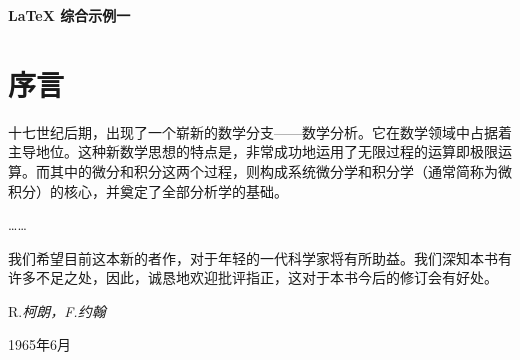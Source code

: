 \documentclass[UTF8,oneside,fontset=founder,12pt]{ctexbook}
\begin{document}
\begin{titlepage}
  \begin{center}
    \huge\textbf{LaTeX 综合示例一}\normalsize
  \end{center}
  
\end{titlepage}

\frontmatter%


\chapter{序言}
十七世纪后期，出现了一个崭新的数学分支——数学分析。它在数学领域中占据着主导地位。这种新数学思想的特点是，非常成功地运用了无限过程的运算即极限运算。而其中的微分和积分这两个过程，则构成系统微分学和积分学（通常简称为微积分）的核心，并奠定了全部分析学的基础。

……

我们希望目前这本新的者作，对于年轻的一代科学家将有所助益。我们深知本书有许多不足之处，因此，诚恳地欢迎批评指正，这对于本书今后的修订会有好处。

\hfill R.\itshape 柯朗，\normalfont F.\itshape 约翰\normalfont

\hfill 1965年6月

\tableofcontents%


\mainmatter


\end{document}
